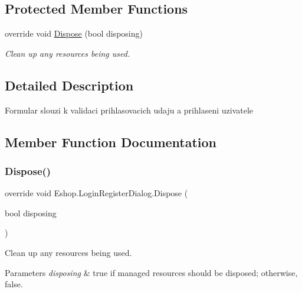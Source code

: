 \subsection*{Protected Member Functions}
\begin{DoxyCompactItemize}
\item 
override void \mbox{\hyperlink{class_eshop_1_1_login_register_dialog_a88f48fb91afd5e29940177fe6fe5deb8}{Dispose}} (bool disposing)
\begin{DoxyCompactList}\small\item\em Clean up any resources being used. \end{DoxyCompactList}\end{DoxyCompactItemize}


\subsection{Detailed Description}
Formular slouzi k validaci prihlasovacich udaju a prihlaseni uzivatele 



\subsection{Member Function Documentation}
\mbox{\label{class_eshop_1_1_login_register_dialog_a88f48fb91afd5e29940177fe6fe5deb8}} 
\subsubsection{\texorpdfstring{Dispose()}{Dispose()}}
{\footnotesize\ttfamily override void Eshop.\+Login\+Register\+Dialog.\+Dispose (\begin{DoxyParamCaption}\item[{bool}]{disposing }\end{DoxyParamCaption})\hspace{0.3cm}{\ttfamily [protected]}}



Clean up any resources being used. 


\begin{DoxyParams}{Parameters}
{\em disposing} & true if managed resources should be disposed; otherwise, false.\\
\hline
\end{DoxyParams}
\mbox{\label{class_eshop_1_1_login_register_dialog_ac2f34eacf82e380a9578df9c77504398}} 
